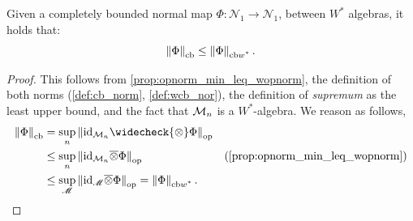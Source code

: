 


\begin{proposition} \label{prop:cb_leq_wcb}
 Given a completely bounded normal map $\Phi:\mathscr{N}_1 \to \mathscr{N}_1 $, between $W^*$ algebras, it holds that:
 \[\left\lVert \Phi \right\rVert_{\text{cb}} \leq \left\lVert \Phi \right\rVert_{\text{cb$w^*$}}. \]
\end{proposition}

\begin{proof}
  This follows from \autoref{prop:opnorm_min_leq_wopnorm}, the definition of both norms (\autoref{def:cb_norm}, \autoref{def:wcb_nor}), the definition of \emph{supremum} as the least upper bound, and the fact that $\mathcal{M}_{n}$ is a $W^*$-algebra. We reason as follows,
\begin{equation*}
  \begin{split}
  \cbnorm{\Phi} & = \sup_{n} \opnorm{\id_{\SqMatrix{n}} \widecheck{\otimes} \Phi } \\
   & \leq \sup_{n} \opnorm{\id_{\SqMatrix{n}} \overline{\otimes} \Phi } & (\text{\autoref{prop:opnorm_min_leq_wopnorm}}) \\
   & \leq \sup_{\mathscr{M}} \opnorm{\id_{\mathscr{M}} \overline{\otimes} \Phi } = \wcbnorm{\Phi}.
    \end{split}
\end{equation*}
\end{proof}

